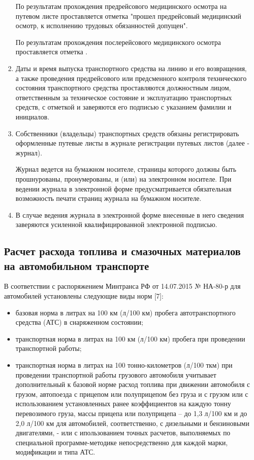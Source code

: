 \documentclass[../nirs.tex]{subfiles}
\begin{document}
\begin{enumerate}
		По результатам прохождения предрейсового медицинского осмотра на путевом
		листе проставляется отметка "прошел предрейсовый медицинский осмотр, к
		исполнению трудовых обязанностей допущен".

		По результатам прохождения послерейсового медицинского осмотра
		проставляется отметка .
	\item Даты и время выпуска транспортного средства на линию и его
		возвращения, а также проведения предрейсового или предсменного контроля
		технического состояния транспортного средства проставляются должностным
		лицом, ответственным за техническое состояние и эксплуатацию
		транспортных средств, с отметкой  и заверяются
		его подписью с указанием фамилии и инициалов.
	\item Собственники (владельцы) транспортных средств обязаны регистрировать
		оформленные путевые листы в журнале регистрации путевых листов (далее -
		журнал).

		Журнал ведется на бумажном носителе, страницы которого должны быть
		прошнурованы, пронумерованы, и (или) на электронном носителе. При
		ведении журнала в электронной форме предусматривается обязательная
		возможность печати страниц журнала на бумажном носителе.
	\item В случае ведения журнала в электронной форме внесенные в него сведения
		заверяются усиленной квалифицированной электронной подписью.
\end{enumerate}

\subsection{Расчет расхода топлива и смазочных материалов на автомобильном
транспорте}
В соответствии с распоряжением Минтранса РФ от 14.07.2015 № НА-80-р для
автомобилей установлены следующие виды норм [7]:
\begin{itemize}
	\item базовая норма в литрах на 100 км (л/100 км) пробега автотранспортного
		средства (АТС) в снаряженном состоянии;
	\item транспортная норма в литрах на 100 км (л/100 км) пробега при
		проведении транспортной работы;
	\item транспортная норма в литрах на 100 тонно-километров (л/100 ткм) при
		проведении транспортной работы грузового автомобиля учитывает
		дополнительный к базовой норме расход топлива при движении автомобиля с
		грузом, автопоезда с прицепом или полуприцепом без груза и с грузом или
		с использованием установленных ранее коэффициентов на каждую тонну
		перевозимого груза, массы прицепа или полуприцепа -- до 1,3 л/100 км и
		до 2,0 л/100 км для автомобилей, соответственно, с дизельными и
		бензиновыми двигателями, - или с ипользованием точных расчетов,
		выполняемых по специальной программе-методике непосредственно для каждой
		марки, модификации и типа АТС.
\end{itemize}
\end{document}
